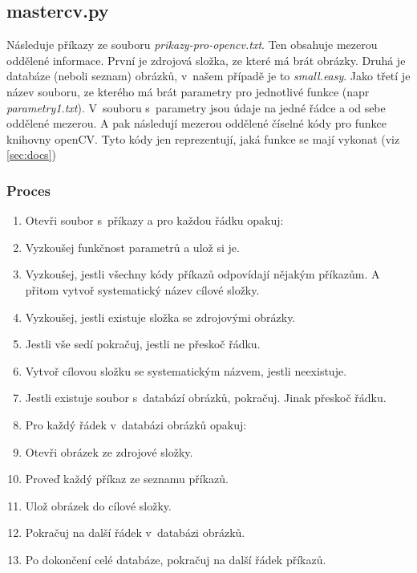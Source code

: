 \documentclass[12pt]{report}			%
\begin{document}
	\subsection{mastercv.py}
	Následuje příkazy ze souboru \emph{prikazy-pro-opencv.txt}. Ten obsahuje mezerou oddělené informace. První je zdrojová složka, ze které má brát obrázky. Druhá je databáze (neboli seznam) obrázků, v~našem případě je to \emph{small.easy}. Jako třetí je název souboru, ze kterého má brát parametry pro jednotlivé funkce (\gls{napr} \emph{parametry1.txt}). V~souboru s~parametry jsou údaje na jedné řádce a od sebe oddělené mezerou. A pak následují mezerou oddělené číselné kódy pro funkce knihovny openCV. Tyto kódy jen reprezentují, jaká funkce se mají vykonat (\gls{viz} \ref{sec:docs})
	\subsubsection{Proces}
	\begin{enumerate}
	\item{Otevři soubor s~příkazy a pro každou řádku opakuj:}
	\item{Vyzkoušej funkčnost parametrů a ulož si je.}
	\item{Vyzkoušej, jestli všechny kódy příkazů odpovídají nějakým příkazům. A přitom vytvoř systematický název cílové složky.}
	\item{Vyzkoušej, jestli existuje složka se zdrojovými obrázky.}
	\item{Jestli vše sedí pokračuj, jestli ne přeskoč řádku.}
	\item{Vytvoř cílovou složku se systematickým názvem, jestli neexistuje.}
	\item{Jestli existuje soubor s~databází obrázků, pokračuj. Jinak přeskoč řádku.}
	\item{Pro každý řádek v~databázi obrázků opakuj:}
	\item{Otevři obrázek ze zdrojové složky.}
	\item{Proveď každý příkaz ze seznamu příkazů.}
	\item{Ulož obrázek do cílové složky.}
	\item{Pokračuj na další řádek v~databázi obrázků.}
	\item{Po dokončení celé databáze, pokračuj na další řádek příkazů.}
	\end{enumerate}	
	
\end{document}
